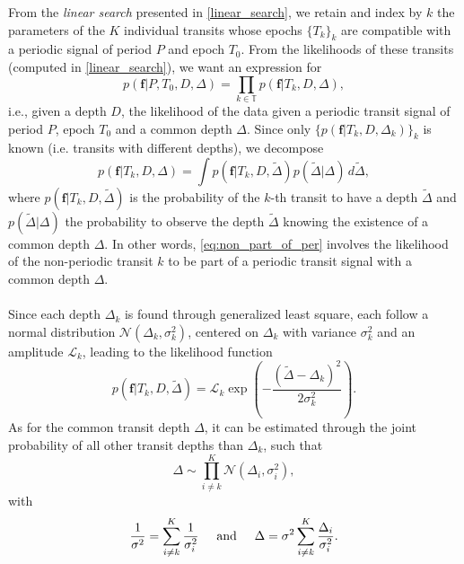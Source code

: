 \documentclass[modern]{aastex631}
\begin{document}
\newcommand{\sumTk}{i\neq k}
From the \textit{linear search} presented in \autoref{linear_search}, we retain and index by $k$ the parameters of the $K$ individual transits whose epochs $\{T_k\}_k$ are compatible with a periodic signal of period $P$ and epoch $T_0$. From the likelihoods of these transits (computed in \autoref{linear_search}), we want an expression for
\begin{equation*}
    p(\bm{f} \vert P, T_0 ,D, \Delta) = \prod_{k\in\mathbb{T}} p(\bm{f} \vert T_k, D, \Delta),
\end{equation*}
i.e., given a depth $D$, the likelihood of the data given a periodic transit signal of period $P$, epoch $T_0$ and a common depth $\Delta$. Since only $\{p(\bm{f} \vert T_k, D, \Delta_k)\}_{k}$ is known (i.e. transits with different depths), we decompose
\begin{equation}\label{eq:non_part_of_per}
    p(\bm{f} \vert T_k, D, \Delta) = \int p(\bm{f} \vert T_k, D, \tilde\Delta)p(\tilde\Delta | \Delta)\, d\tilde\Delta,
\end{equation}
where $p(\bm{f} \vert T_k, D, \tilde\Delta)$ is the probability of the $k$-th transit to have a depth $\tilde\Delta$ and $p(\tilde\Delta | \Delta)$ the probability to observe the depth $\tilde\Delta$ knowing the existence of a common depth $\Delta$. In other words, \autoref{eq:non_part_of_per} involves the likelihood of the non-periodic transit $k$ to be part of a periodic transit signal with a common depth $\Delta$.
\\\\
Since each depth $\Delta_k$ is found through generalized least square, each follow a normal distribution $\mathcal{N}(\Delta_k, \sigma_k^2)$, centered on $\Delta_k$ with variance $\sigma_k^2$ and an amplitude $\mathcal{L}_k$, leading to the likelihood function
\begin{equation*}
    p(\bm{f} \vert T_k, D, \tilde\Delta) = \mathcal{L}_k\exp \left(-\frac{(\tilde\Delta-\Delta_k)^2}{2\sigma_k^2}\right).
\end{equation*}
As for the common transit depth $\Delta$, it can be estimated through the joint probability of all other transit depths than $\Delta_k$, such that
\begin{equation*}
    \Delta \sim \prod_{\sumTk}^K \mathcal{N}(\Delta_i, \sigma_i^2),
\end{equation*}
with 
\begin{equation}\label{eq:params}
\frac{1}{\sigma^2} = \sum_{\sumTk}^K \frac{1}{\sigma_i^2} \hspace{0.5cm} \text{and} \hspace{0.5cm}
\Delta =\sigma^2 \sum_{\sumTk}^K {\frac{\Delta_i}{\sigma_i^2}}.
\end{equation}
\end{document}
